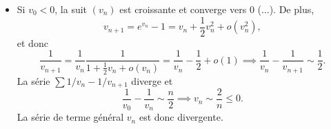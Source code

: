 \begin{enonce}
\begin{solution}
\begin{enumerate}
\begin{itemize}
        \item Si $v_0<0$, la suit $(v_n)$ est croissante et converge vers $0$ (...).
          De plus, 
          \begin{equation*}
            v_{n+1} = e^{v_n} - 1 = v_n  + \frac12 v_n^2 + o(v_n^2),
          \end{equation*}
          et donc
          \begin{equation*}
            \frac{1}{v_{n+1}} = \frac{1}{v_n}\frac{1}{1 + \frac{1}{2}v_n + o(v_n)} = \frac{1}{v_n} - \frac12 + o(1)
            \implies
            \frac{1}{v_n} - \frac{1}{v_{n+1}} \sim \frac12.
          \end{equation*}
          La série $\sum 1/v_n - 1/{v_{n+1}}$ diverge et 
          \begin{equation*}
            \frac{1}{v_0} - \frac{1}{v_n} \sim \frac{n}{2}
            \implies
            v_n \sim \frac{2}{n}\leq 0.
          \end{equation*}
          La série de terme général $v_n$ est donc divergente.
      \end{itemize}
  \end{enumerate}
\end{solution}
\end{enonce}

